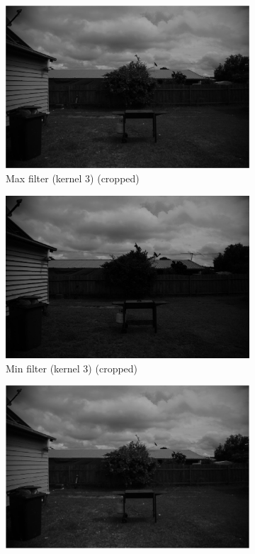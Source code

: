 \documentclass{article}
\begin{document}
\begin{figure}[H]
	\begin{subfigure}{0.45\textwidth}
		\includegraphics[trim={20cm 25cm 25cm 10cm},clip,width=\textwidth]{Generated/Garden_max3filter.png}
		\caption{Max filter (kernel 3) (cropped)}
	\end{subfigure}
	\hfill
	\begin{subfigure}{0.45\textwidth}
		\includegraphics[trim={20cm 25cm 25cm 10cm},clip,width=\textwidth]{Generated/Garden_min3filter.png}
		\caption{Min filter (kernel 3) (cropped)}
	\end{subfigure}
	\begin{subfigure}{0.45\textwidth}
		\includegraphics[trim={20cm 25cm 25cm 10cm},clip,width=\textwidth]{Generated/Garden_max5filter.png}

\end{subfigure}
\end{figure}
\end{document}
